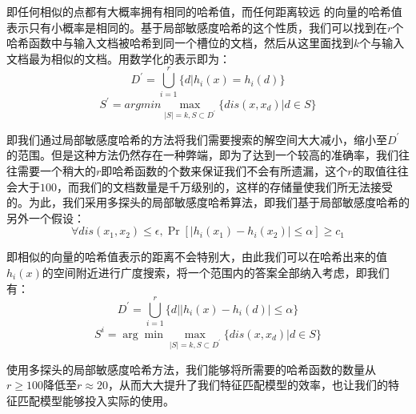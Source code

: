 即任何相似的点都有大概率拥有相同的哈希值，而任何距离较远 的向量的哈希值表示只有小概率是相同的。基于局部敏感度哈希的这个性质，我们可以找到在$r$个哈希函数中与输入文档被哈希到同一个槽位的文档，然后从这里面找到$k$个与输入文档最为相似的文档。用数学化的表示即为：
	\begin{equation}
		D^{'}=\bigcup_{i=1}^{r}\{d|h_{i}(x)=h_{i}(d)\} 
	\end{equation}
	\begin{equation}
		S^{'} = argmin \max_{|S|=k,S \subset D^{'}}\{dis(x,x_d)|d \in S\}
	\end{equation}

即我们通过局部敏感度哈希的方法将我们需要搜索的解空间大大减小，缩小至$D^{'}$的范围。但是这种方法仍然存在一种弊端，即为了达到一个较高的准确率，我们往往需要一个稍大的$ r $即哈希函数的个数来保证我们不会有所遗漏，这个$r$的取值往往会大于$100$，而我们的文档数量是千万级别的，这样的存储量使我们所无法接受的。为此，我们采用多探头的局部敏感度哈希算法，即我们基于局部敏感度哈希的另外一个假设：
	\begin{equation}
		\forall dis(x_{1},x_{2}) \leq \epsilon, \Pr⁡[|h_i(x_1 )-h_i(x_2 )| \leq \alpha ]\geq c_1
	\end{equation}
	
即相似的向量的哈希值表示的距离不会特别大，由此我们可以在哈希出来的值$h_i(x)$的空间附近进行广度搜索，将一个范围内的答案全部纳入考虑，即我们有：
	\begin{equation}
		D^{'}= \bigcup_{i=1}^{r}\{d| |h_i(x)-h_i(d)|\leq \alpha\} 
	\end{equation}
	\begin{equation}
		S^{i} = \arg\min\max_{|S| = k, S \subset D^{'}}\{dis(x, x_{d}) | d \in S\} 
	\end{equation}

使用多探头的局部敏感度哈希方法，我们能够将所需要的哈希函数的数量从$r \geq 100$降低至$r \approx 20$，从而大大提升了我们特征匹配模型的效率，也让我们的特征匹配模型能够投入实际的使用。

